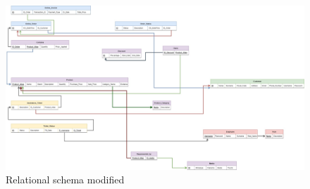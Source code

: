 \begin{figure}[H]
\centering
\includegraphics[width=16.5cm]{Schemas/LogicRS_modified.jpg}
\caption{Relational schema modified}
\label{ls_modified}
\end{figure}